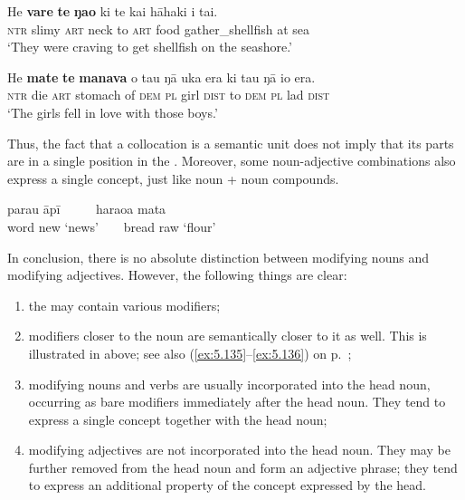 \ea\label{ex:5.110}
\gll He \textbf{vare} \textbf{te} \textbf{ŋao} ki te kai hāhaki {\ꞌ}i tai.\\
\textsc{ntr} slimy \textsc{art} neck to \textsc{art} food gather\_shellfish at sea\\

\glt 
‘They were craving to get shellfish on the seashore.’ \textstyleExampleref{[Mtx-7-30.043]}
\z

\ea\label{ex:5.111}
\gll He \textbf{mate} \textbf{te} \textbf{manava} o tau ŋā uka era ki tau ŋā io era.\\
\textsc{ntr} die \textsc{art} stomach of \textsc{dem} \textsc{pl} girl \textsc{dist} to \textsc{dem} \textsc{pl} lad \textsc{dist}\\

\glt
‘The girls fell in love with those boys.’ \textstyleExampleref{[Mtx-6-03.079]}
\z

Thus, the fact that a collocation is a semantic unit does not imply that its parts are in a single position in the . Moreover, some noun-adjective combinations also express a single concept, just like noun + noun compounds.

\ea\label{ex:5.112}
\gll parau{\rmfnm} {\ꞌ}āpī ~ ~ ~ haraoa mata \\
word new ‘news’ ~ ~ bread raw ‘flour’\\
\z
{}

In conclusion, there is no absolute distinction between modifying nouns and modifying adjectives. However, the following things are clear:

\begin{enumerate}
\item 
the  may contain various modifiers;

\item 
modifiers closer to the noun are semantically closer to it as well. This is illustrated in  above; see also (\ref{ex:5.135}–\ref{ex:5.136}) on p.~\pageref{ex:5.135};

\item 
modifying nouns and verbs are usually incorporated into the head noun, occurring as bare modifiers immediately after the head noun. They tend to express a single concept together with the head noun;

\item 
modifying adjectives are not incorporated into the head noun. They may be further removed from the head noun and form an adjective phrase; they tend to express an additional property of the concept expressed by the head. 

\end{enumerate}

